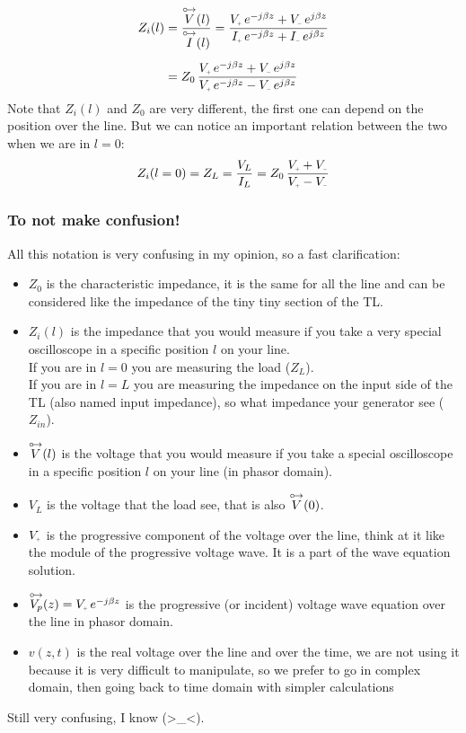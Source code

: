 \begin{align}
    \begin{split}\label{eq:input_impedance}
      Z_i(l)&=\frac{\phas{V}(l)}{\phas{I}(l)}=\frac{V\bottomPlus \,e^{-j\beta z}+V\bottomMinus \,e^{j\beta z}}{I\bottomPlus \,e^{-j\beta z}+I\bottomMinus \,e^{j\beta z}}\\[5pt]
      &=Z_0\,\frac{V\bottomPlus \,e^{-j\beta z}+V\bottomMinus \,e^{j\beta z}}{V\bottomPlus \,e^{-j\beta z}-V\bottomMinus \,e^{j\beta z}}
    \end{split}
\end{align}
Note that $Z_i(l)$ and $Z_0$ are very different, the first one can depend on the position over the line. But we can notice an important relation between the two when we are in $l=0$:
\begin{equation}\label{eq:input_impedance_l=0}
    Z_i(l=0)=Z_L=\frac{V_L}{I_L}=Z_0 \,\frac{V\bottomPlus +V\bottomMinus }{V\bottomPlus -V\bottomMinus }
\end{equation}
\subsubsection*{To not make confusion!}
All this notation is very confusing in my opinion, so a fast clarification:
\begin{itemize}
    \item $Z_0$ is the characteristic impedance, it is the same for all the line and can be considered like the impedance of the tiny tiny section of the TL.
    \item $Z_i(l)$ is the impedance that you would measure if you take a very special oscilloscope in a specific position $l$ on your line.\\
    If you are in $l=0$ you are measuring the load ($Z_L$).\\
    If you are in $l=L$ you are measuring the impedance on the input side of the TL (also named input impedance), so what impedance your generator see ($Z_{in}$).
    \item $\overset{\mathbin {{\circ \mkern-2.5mu\rightarrow}}}{V}(l)$ is the voltage that you would measure if you take a special oscilloscope in a specific position $l$ on your line (in phasor domain).
    \item $V_L$ is the voltage that the load see, that is also $\overset{\mathbin {{\circ \mkern-2.5mu\rightarrow}}}{V}(0)$.
    \item $V\bottomPlus$ is the progressive component of the voltage over the line, think at it like the module of the progressive voltage wave. It is a part of the wave equation solution. 
    \item $\phas{V_p}(z)=V\bottomPlus \,e^{-j\beta z}$ is the progressive (or incident) voltage wave equation over the line in phasor domain.
    \item $v(z,t)$ is the real voltage over the line and over the time, we are not using it because it is very difficult to manipulate, so we prefer to go in complex domain, then going back to time domain with simpler calculations
\end{itemize}
Still very confusing, I know (\textgreater\_\textless).
